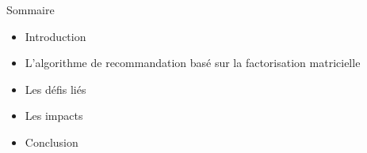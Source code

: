 \begin{frame}{Sommaire}
    \begin{itemize}
        \item Introduction
        \item L'algorithme de recommandation basé sur la factorisation matricielle
        \item Les défis liés
        \item Les impacts
        \item Conclusion
    \end{itemize}
\end{frame}
